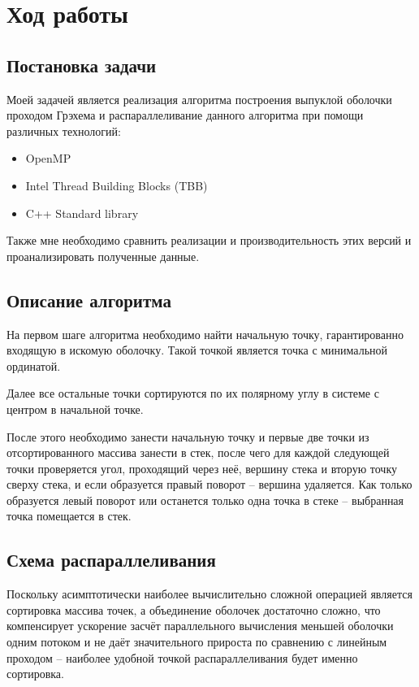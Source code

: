 \documentclass[a4paper,12pt]{article}
\begin{document}
\section{Ход работы}
\subsection{Постановка задачи}

Моей задачей является реализация алгоритма построения выпуклой оболочки 
проходом Грэхема и распараллеливание данного алгоритма при помощи различных технологий:

\begin{itemize}
    \item OpenMP
    \item Intel Thread Building Blocks (TBB)
    \item C++ Standard library
\end{itemize}

Также мне необходимо сравнить реализации и производительность этих
версий и проанализировать полученные данные.

\subsection{Описание алгоритма}

На первом шаге алгоритма необходимо найти начальную точку, гарантированно входящую
в искомую оболочку. Такой точкой является точка с минимальной ординатой.

Далее все остальные точки сортируются по их полярному углу в системе с центром
в начальной точке. 

После этого необходимо занести начальную точку и первые две точки из отсортированного массива занести в стек, 
после чего для каждой следующей точки проверяется угол, проходящий через неё, вершину стека и вторую точку сверху стека, и если 
образуется правый поворот -- вершина удаляется. Как только образуется левый поворот или останется только одна точка в стеке --
выбранная точка помещается в стек. 

\subsection{Схема распараллеливания}

Поскольку асимптотически наиболее вычислительно сложной операцией является сортировка массива точек,
а объединение оболочек достаточно сложно, что компенсирует ускорение засчёт параллельного вычисления 
меньшей оболочки одним потоком и не даёт значительного прироста по сравнению с линейным проходом -- 
наиболее удобной точкой распараллеливания будет именно сортировка.
\end{document}
